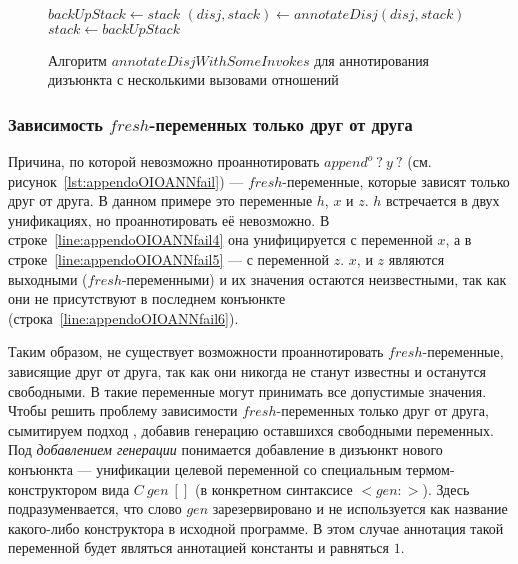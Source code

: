 \begin{figure}[h!]
  \begin{center}
  \begin{minipage}{1\textwidth}
\begin{algorithm}[H]
  \begin{algorithmic}
      \State $backUpStack \gets stack$
        \State $(disj, stack) \gets annotateDisj(disj, stack)$
           \EndReturn
        \Else
          \State $stack \gets backUpStack$
        \EndIf
         \EndReturn
      \EndFor
    \EndFunction
  \end{algorithmic}
\end{algorithm}
  \end{minipage}
  \end{center}
  \caption{Алгоритм $annotateDisjWithSomeInvokes$ для аннотирования дизъюнкта с несколькими вызовами отношений}
  \label{alg:annotateDisjWithSomeInvokes}
\end{figure}


\subsubsection{Зависимость $fresh$-переменных только друг от друга}
\label{lab:gen}

Причина, по которой невозможно проаннотировать $append^o \ ? \ y \ ?$ (см. рисунок~\ref{lst:appendoOIOANNfail}) --- $fresh$-переменные, которые зависят только друг от друга.
В данном примере это переменные $h$, $x$ и $z$.
$h$ встречается в двух унификациях, но проаннотировать её невозможно.
В строке~\ref{line:appendoOIOANNfail4} она унифицируется с переменной $x$, а в строке~\ref{line:appendoOIOANNfail5} --- с переменной $z$.
$x$, и $z$ являются выходными ($fresh$-переменными) и их значения остаются неизвестными, так как они не присутствуют в последнем конъюнкте (строка~\ref{line:appendoOIOANNfail6}).

Таким образом, не существует возможности проаннотировать $fresh$-переменные, зависящие друг от друга, так как они никогда не станут известны и останутся свободными.
В \miniKanren{} такие переменные могут принимать все допустимые значения.
Чтобы решить проблему зависимости $fresh$-переменных только друг от друга, сымитируем подход \miniKanren{}, добавив генерацию оставшихся свободными переменных.
Под \emph{добавлением генерации} понимается добавление в дизъюнкт нового конъюнкта --- унификации целевой переменной со специальным термом-конструктором вида $C~gen~[]$ (в конкретном синтаксисе $<gen:>$).
Здесь подразуменвается, что слово $gen$ зарезервировано и не используется как название какого-либо конструктора в исходной программе.
В этом случае аннотация такой переменной будет являться аннотацией константы и равняться $1$.

